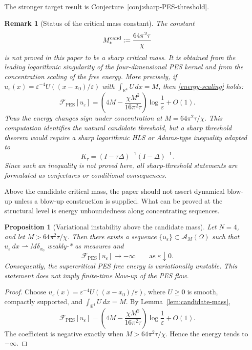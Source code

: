 \documentclass[pdflatex,sn-mathphys-num]{sn-jnl}%
\theoremstyle{thmstyleone}
\newtheorem{proposition}[theorem]{Proposition}%
\theoremstyle{thmstyletwo}
\newtheorem{remark}{Remark}
\theoremstyle{thmstylethree}
\begin{document}
The stronger target result is Conjecture~\ref{conj:sharp-PES-threshold}.

\begin{remark}[Status of the critical mass constant]
\label{rem:status-critical-mass}
The constant
\[
        M_*^{\rm cand}:=\frac{64\pi^2\tau}{\chi}
\]
is not proved in this paper to be a sharp critical mass.  It is obtained from
the leading logarithmic singularity of the four-dimensional PES kernel and from
the concentration scaling of the free energy.  More precisely, if
\(u_\varepsilon(x)=\varepsilon^{-4}U((x-x_0)/\varepsilon)\) with
\(\int_{\mathbb R^4}U\,dx=M\), then \eqref{energy-scaling} holds:
\[
        \mathcal F_{\mathrm{PES}}[u_\varepsilon]
        =
        \left(
        4M-\frac{\chi M^2}{16\pi^2\tau}
        \right)\log\frac1\varepsilon+O(1).
\]
Thus the energy changes sign under concentration at
\(M=64\pi^2\tau/\chi\).  This computation identifies the natural candidate
threshold, but a sharp threshold theorem would require a sharp logarithmic
HLS or Adams-type inequality adapted to
\[
        K_\tau=(I-\tau\Delta)^{-1}(I-\Delta)^{-1}.
\]
Since such an inequality is not proved here, all sharp-threshold statements are
formulated as conjectures or conditional consequences.
\end{remark}

Above the candidate critical mass, the paper should not assert dynamical blow-up unless a blow-up construction is supplied.  What can be proved at the structural level is energy unboundedness along concentrating sequences.

\begin{proposition}[Variational instability above the candidate mass]
\label{prop:variational-instability-PES}
Let \(N=4\), and let \(M>64\pi^2\tau/\chi\).  Then there exists a sequence
\(\{u_\varepsilon\}\subset\mathcal A_M(\Omega)\) such that
\(u_\varepsilon\,dx\rightharpoonup M\delta_{x_0}\) weakly-* as measures and
\[
        \mathcal F_{\mathrm{PES}}[u_\varepsilon]\to-\infty
        \qquad\text{as }\varepsilon\downarrow0 .
\]
Consequently, the supercritical PES free energy is variationally unstable.
This statement does not imply finite-time blow-up of the PES flow.
\end{proposition}

\begin{proof}
Choose \(u_\varepsilon(x)=\varepsilon^{-4}U((x-x_0)/\varepsilon)\), where \(U\ge0\) is smooth, compactly supported, and \(\int_{\mathbb R^4}U\,dx=M\).  By Lemma~\ref{lem:candidate-mass},
\[
        \mathcal F_{\mathrm{PES}}[u_\varepsilon]
        =
        \left(4M-\frac{\chi M^2}{16\pi^2\tau}\right)\log\frac1\varepsilon+O(1).
\]
The coefficient is negative exactly when \(M>64\pi^2\tau/\chi\).  Hence the energy tends to \(-\infty\).
\end{proof}
\end{document}
